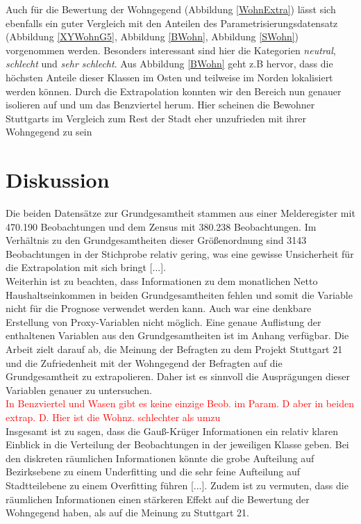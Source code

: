 \documentclass{Vorlage}
\begin{document}
Auch für die Bewertung der Wohngegend (Abbildung \ref{WohnExtra}) lässt sich ebenfalls ein guter Vergleich mit den Anteilen des Parametrisierungsdatensatz (Abbildung \ref{XYWohnG5}, Abbildung \ref{BWohn}, Abbildung \ref{SWohn}) vorgenommen werden. Besonders interessant sind hier die Kategorien \textit{neutral}, \textit{schlecht} und \textit{sehr schlecht}. Aus Abbildung \ref{BWohn} geht z.B hervor, dass die höchsten Anteile dieser Klassen im Osten und teilweise im Norden lokalisiert werden können. Durch die Extrapolation konnten wir den Bereich nun genauer isolieren auf und um das Benzviertel herum. Hier scheinen die Bewohner Stuttgarts im Vergleich zum Rest der Stadt eher unzufrieden mit ihrer Wohngegend zu sein


\clearpage
\section{Diskussion}
Die beiden Datensätze zur Grundgesamtheit stammen aus einer Melderegister mit 470.190 Beobachtungen und dem Zensus mit 380.238 Beobachtungen. Im Verhältnis zu den Grundgesamtheiten dieser Größenordnung sind 3143 Beobachtungen in der Stichprobe relativ gering, was eine gewisse Unsicherheit für die Extrapolation mit sich bringt [...].\\
Weiterhin ist zu beachten, dass Informationen zu dem monatlichen Netto Haushaltseinkommen in beiden Grundgesamtheiten fehlen und somit die Variable nicht für die Prognose verwendet werden kann. Auch war eine denkbare Erstellung von Proxy-Variablen nicht möglich. Eine genaue Auflistung der enthaltenen Variablen aus den Grundgesamtheiten ist im Anhang verfügbar. Die Arbeit zielt darauf ab, die Meinung der Befragten zu dem Projekt Stuttgart 21 und die Zufriedenheit mit der Wohngegend der Befragten auf die Grundgesamtheit zu extrapolieren. Daher ist es sinnvoll die Ausprägungen dieser Variablen genauer zu untersuchen.\\

\textcolor{red}{In Benzviertel und Wasen gibt es keine einzige Beob. im Param. D aber in beiden extrap. D. Hier ist die Wohnz. schlechter als umzu}\\
Insgesamt ist zu sagen, dass die Gauß-Krüger Informationen ein relativ klaren Einblick in die Verteilung der Beobachtungen in der jeweiligen Klasse geben. Bei den diskreten räumlichen Informationen könnte die grobe Aufteilung auf Bezirksebene zu einem Underfitting und die sehr feine Aufteilung auf Stadtteilebene zu einem Overfitting führen [...]. Zudem ist zu vermuten, dass die räumlichen Informationen einen stärkeren Effekt auf die Bewertung der Wohngegend haben, als auf die Meinung zu Stuttgart 21.
\end{document}
